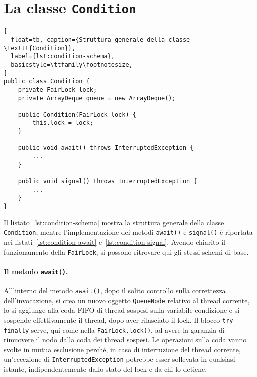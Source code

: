 \documentclass[a4paper,twoside]{article}
\newcommand\code{\lstinline[basicstyle=\normalsize\ttfamily]}
\begin{document}
\section{La classe \texttt{Condition}}

\begin{lstlisting}[
  float=tb, caption={Struttura generale della classe \texttt{Condition}},
  label={lst:condition-schema},
  basicstyle=\ttfamily\footnotesize,
]
public class Condition {
	private FairLock lock;
	private ArrayDeque queue = new ArrayDeque();

	public Condition(FairLock lock) {
		this.lock = lock;
	}

	public void await() throws InterruptedException {
		...
	}

	public void signal() throws InterruptedException {
		...
	}
}
\end{lstlisting}





Il listato~\ref{lst:condition-schema} mostra la struttura generale della classe \code|Condition|, mentre l'implementazione dei metodi \code|await()| e \code|signal()| è riportata nei listati~\ref{lst:condition-await} e~\ref{lst:condition-signal}. Avendo chiarito il funzionamento della \code|FairLock|, si possono ritrovare qui gli stessi schemi di base.

\paragraph{Il metodo \texttt{await()}.}
All'interno del metodo \code|await()|, dopo il solito controllo sulla correttezza dell'invocazione, si crea un nuovo oggetto \code|QueueNode| relativo al thread corrente, lo si aggiunge alla coda FIFO di thread sospesi sulla variabile condizione e si sospende effettivamente il thread, dopo aver rilasciato il lock. Il blocco \code|try-finally| serve, qui come nella \code|FairLock.lock()|, ad avere la garanzia di rimuovere il nodo dalla coda dei thread sospesi. Le operazioni sulla coda vanno svolte in mutua esclusione perché, in caso di interruzione del thread corrente, un'eccezione di \code|InterruptedException| potrebbe esser sollevata in qualsiasi istante, indipendentemente dallo stato del lock e da chi lo detiene.
\end{document}
